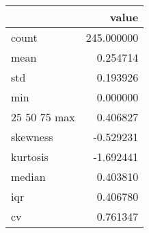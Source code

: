 \begin{tabular}{lr}
\toprule
 & value \\
\midrule
count & 245.000000 \\
mean & 0.254714 \\
std & 0.193926 \\
min & 0.000000 \\
25%
50%
75%
max & 0.406827 \\
skewness & -0.529231 \\
kurtosis & -1.692441 \\
median & 0.403810 \\
iqr & 0.406780 \\
cv & 0.761347 \\
\bottomrule
\end{tabular}
